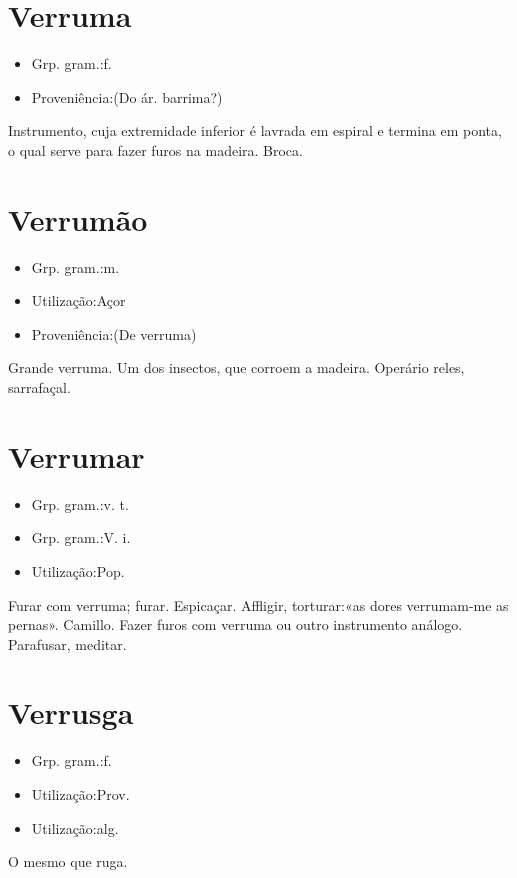 \documentclass{article}
\begin{document}
\section{Verruma}
\begin{itemize}
\item {Grp. gram.:f.}
\end{itemize}
\begin{itemize}
\item {Proveniência:(Do ár. \textunderscore barrima\textunderscore ?)}
\end{itemize}
Instrumento, cuja extremidade inferior é lavrada em espiral e termina em ponta, o qual serve para fazer furos na madeira.
Broca.
\section{Verrumão}
\begin{itemize}
\item {Grp. gram.:m.}
\end{itemize}
\begin{itemize}
\item {Utilização:Açor}
\end{itemize}
\begin{itemize}
\item {Proveniência:(De \textunderscore verruma\textunderscore )}
\end{itemize}
Grande verruma.
Um dos insectos, que corroem a madeira.
Operário reles, sarrafaçal.
\section{Verrumar}
\begin{itemize}
\item {Grp. gram.:v. t.}
\end{itemize}
\begin{itemize}
\item {Grp. gram.:V. i.}
\end{itemize}
\begin{itemize}
\item {Utilização:Pop.}
\end{itemize}
Furar com verruma; furar.
Espicaçar.
Affligir, torturar:«\textunderscore as dores verrumam-me as pernas\textunderscore ». Camillo.
Fazer furos com verruma ou outro instrumento análogo.
Parafusar, meditar.
\section{Verrusga}
\begin{itemize}
\item {Grp. gram.:f.}
\end{itemize}
\begin{itemize}
\item {Utilização:Prov.}
\end{itemize}
\begin{itemize}
\item {Utilização:alg.}
\end{itemize}
O mesmo que \textunderscore ruga\textunderscore .
\end{document}
